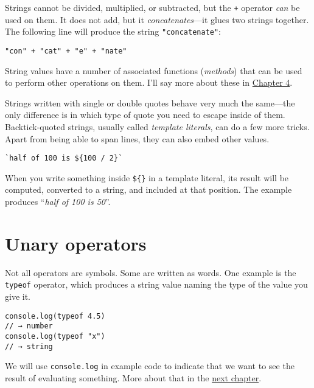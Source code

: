 Strings cannot be divided, multiplied, or subtracted, but the \lstinline`+` operator \emph{can} be used on them. It does not add, but it \emph{concatenates}—it glues two strings together. The following line will produce the string \lstinline`"concatenate"`:

\begin{lstlisting}
"con" + "cat" + "e" + "nate"
\end{lstlisting}
\noindent

String values have a number of associated functions (\emph{methods}) that can be used to perform other operations on them. I'll say more about these in \hyperref[data.methods]{Chapter 4}.

Strings written with single or double quotes behave very much the same—the only difference is in which type of quote you need to escape inside of them. Backtick-quoted strings, usually called \emph{template
literals}, can do a few more tricks. Apart from being able to span lines, they can also embed other values.

\begin{lstlisting}
`half of 100 is ${100 / 2}`
\end{lstlisting}
\noindent

When you write something inside \lstinline`${}` in a template literal, its result will be computed, converted to a string, and included at that position. The example produces ``\emph{half of 100 is 50}''.

\section{Unary operators}

Not all operators are symbols. Some are written as words. One example is the \lstinline`typeof` operator, which produces a string value naming the type of the value you give it.

\begin{lstlisting}
console.log(typeof 4.5)
// → number
console.log(typeof "x")
// → string
\end{lstlisting}
\noindent{}

\label{values.console.log}We will use \lstinline`console.log` in example code to indicate that we want to see the result of evaluating something. More about that in the \hyperref[program_structure]{next chapter}.

